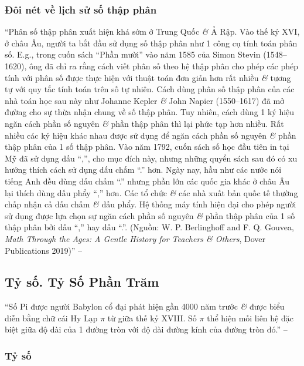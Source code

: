 \documentclass{article}
\numberwithin{equation}{section}
\begin{document}
\subsubsection{Đôi nét về lịch sử số thập phân}
``Phân số thập phân xuất hiện khá sớm ở Trung Quốc \textit{\&} Ả Rập. Vào thế kỷ XVI, ở châu Âu, người ta bắt đầu sử dụng số thập phân như 1 công cụ tính toán phân số. E.g., trong cuốn sách ``Phần mười'' vào năm 1585 của Simon Stevin (1548--1620), ông đã chỉ ra rằng cách viết phân số theo hệ thập phân cho phép các phép tính với phân số được thực hiện với thuật toán đơn giản hơn rất nhiều \textit{\&} tương tự với quy tắc tính toán trên số tự nhiên. Cách dùng phân số thập phân của các nhà toán học sau này như Johanne Kepler \textit{\&} John Napier (1550--1617) đã mở đường cho sự thừa nhận chung về số thập phân. Tuy nhiên, cách dùng 1 ký hiệu ngăn cách phần số nguyên \textit{\&} phần thập phân thì lại phức tạp hơn nhiều. Rất nhiều các ký hiệu khác nhau được sử dụng để ngăn cách phần số nguyên \textit{\&} phần thập phân của 1 số thập phân. Vào năm 1792, cuốn sách số học đầu tiên in tại Mỹ đã sử dụng dấu ``,'', cho mục đích này, nhưng những quyển sách sau đó có xu hướng thích cách sử dụng dấu chấm ``.'' hơn. Ngày nay, hầu như các nước nói tiếng Anh đều dùng dấu chấm ``.'' nhưng phần lớn các quốc gia khác ở châu Âu lại thích dùng dấu phẩy ``,'' hơn. Các tổ chức \textit{\&} các nhà xuất bản quốc tế thường chấp nhận cả dấu chấm \textit{\&} dấu phẩy. Hệ thống máy tính hiện đại cho phép người sử dụng được lựa chọn sự ngăn cách phần số nguyên \textit{\&} phần thập phân của 1 số thập phân bởi dấu ``,'' hay dấu ``.''. (Nguồn: W. P. Berlinghoff and F. Q. Gouvea, \textit{Math Through the Ages: A Gentle History for Teachers \textit{\&} Others}, Dover Publications 2019)'' -- \cite[p. 60]{SGK_Toan_6_Canh_Dieu_tap_2}


\subsection{Tỷ số. Tỷ Số Phần Trăm}
``Số Pi được người Babylon cổ đại phát hiện gần 4000 năm trước \textit{\&} được biểu diễn bằng chữ cái Hy Lạp $\pi$ từ giữa thế kỷ XVIII. Số $\pi$ thể hiện mối liên hệ đặc biệt giữa độ dài của 1 đường tròn với độ dài đường kính của đường tròn đó.'' -- \cite[p. 61]{SGK_Toan_6_Canh_Dieu_tap_2}

\subsubsection{Tỷ số}
\end{document}

